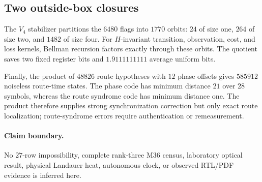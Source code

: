 \subsection{Two outside-box closures}
The $V_4$ stabilizer partitions the $6480$ flags into $1770$ orbits:
$24$ of size one, $264$ of size two, and $1482$ of size four.  For $H$-invariant transition,
observation, cost, and loss kernels, Bellman recursion factors exactly through these orbits.
The quotient saves two fixed register bits and $1.9111111111$ average uniform bits.

Finally, the product of $48826$ route hypotheses with $12$ phase offsets gives $585912$
noiseless route-time states.  The phase code has minimum distance $21$ over $28$ symbols,
whereas the route syndrome code has minimum distance one.  The product therefore supplies
strong synchronization correction but only exact route localization; route-syndrome errors
require authentication or remeasurement.

\paragraph{Claim boundary.}
No $27$-row impossibility, complete rank-three M36 census, laboratory optical result,
physical Landauer heat, autonomous clock, or observed RTL/PDF evidence is inferred here.

